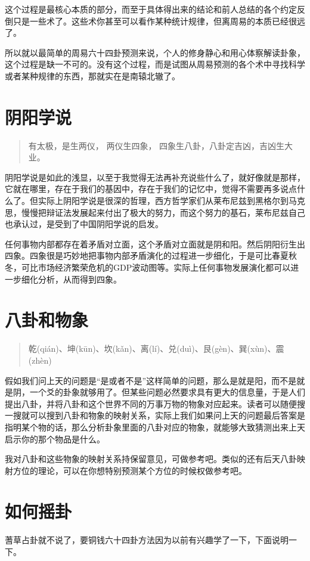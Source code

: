 \documentclass[12pt,oneside]{book}
\begin{document}
这个过程是最核心本质的部分，而至于具体得出来的结论和前人总结的各个约定反倒只是一些术了。这些术你甚至可以看作某种统计规律，但离周易的本质已经很远了。

所以就以最简单的周易六十四卦预测来说，个人的修身静心和用心体察解读卦象，这个过程是缺一不可的。没有这个过程，而是试图从周易预测的各个术中寻找科学或者某种规律的东西，那就实在是南辕北辙了。



\section{阴阳学说}
\begin{quote}
有太极，是生两仪， 两仪生四象， 四象生八卦，八卦定吉凶，吉凶生大业。
\end{quote}


阴阳学说是如此的浅显，以至于我觉得无法再补充说些什么了，就好像就是那样，它就在哪里，存在于我们的基因中，存在于我们的记忆中，觉得不需要再多说点什么了。但实际上阴阳学说是很深的哲理，西方哲学家们从莱布尼兹到黑格尔到马克思，慢慢把辩证法发展起来付出了极大的努力，而这个努力的基石，莱布尼兹自己也承认过，是受到了中国阴阳学说的启发。

任何事物内部都存在着矛盾对立面，这个矛盾对立面就是阴和阳。然后阴阳衍生出四象。四象很是巧妙地把事物内部矛盾演化的过程进一步细化，于是可比春夏秋冬，可比市场经济繁荣危机的GDP波动图等。实际上任何事物发展演化都可以进一步细化分析，从而得到四象。

\section{八卦和物象}
\begin{quote}
乾(qián)、坤(kūn)、坎(kǎn)、离(lí)、兑(duì)、艮(gèn)、巽(xùn)、震(zhèn)
\end{quote}


假如我们问上天的问题是“是或者不是”这样简单的问题，那么是就是阳，而不是就是阴，一个爻的卦象就够用了。但某些问题必然要求具有更大的信息量，于是人们提出八卦，并将八卦和这个世界不同的万事万物的物象对应起来。读者可以随便搜一搜就可以搜到八卦和物象的映射关系，实际上我们如果问上天的问题最后答案是指明某个物的话，那么分析卦象里面的八卦对应的物象，就能够大致猜测出来上天启示你的那个物品是什么。

我对八卦和这些物象的映射关系持保留意见，可做参考吧。类似的还有后天八卦映射方位的理论，可以在你想特别预测某个方位的时候权做参考吧。



\section{如何摇卦}
蓍草占卦就不说了，要铜钱六十四卦方法因为以前有兴趣学了一下，下面说明一下。
\end{document}
